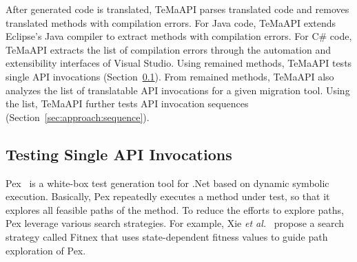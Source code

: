After generated code is translated, TeMaAPI parses translated code and removes translated methods with compilation errors. For Java code, TeMaAPI extends Eclipse's Java compiler to extract methods with compilation errors. For C\# code, TeMaAPI extracts the list of compilation errors through the automation and extensibility interfaces of Visual Studio. Using remained methods, TeMaAPI tests single API invocations (Section~\ref{sec:approach:single}). From remained methods, TeMaAPI also analyzes the list of translatable API invocations for a given migration tool. Using the list, TeMaAPI further tests API invocation sequences (Section~\ref{sec:approach:sequence}).


%


\subsection{Testing Single API Invocations}
\label{sec:approach:single}

Pex~\cite{tillmann2008pex} is a white-box test generation tool for .Net based on dynamic symbolic execution. Basically, Pex repeatedly executes a method under test, so that it explores all feasible paths of the method. To reduce the efforts to explore paths, Pex leverage various search strategies. For example, Xie \emph{et al.}~\cite{xie09:fitness} propose a search strategy called Fitnex that uses state-dependent fitness values to guide path exploration of Pex.

